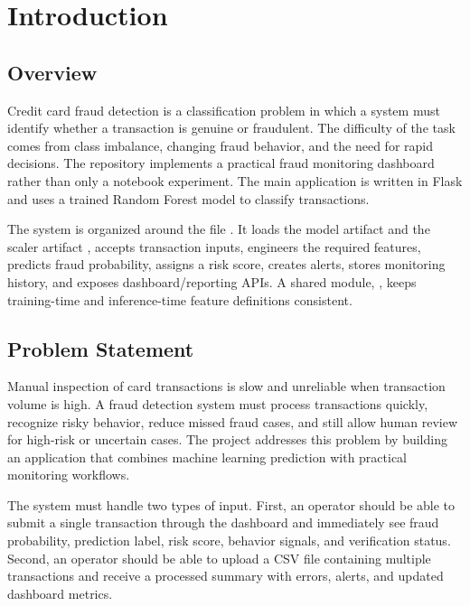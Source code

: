 \documentclass[12pt,a4paper]{report}
\begin{document}
\setcounter{page}{1}
\pagestyle{fancy}
\fancyhf{}
\fancyfoot[C]{\thepage}
\renewcommand{\headrulewidth}{0pt}
\fancypagestyle{plain}{
    \fancyhf{}
    \fancyfoot[C]{\thepage}
    \renewcommand{\headrulewidth}{0pt}
}

\chapter{Introduction}

\section{Overview}
Credit card fraud detection is a classification problem in which a system must identify whether a transaction is genuine or fraudulent. The difficulty of the task comes from class imbalance, changing fraud behavior, and the need for rapid decisions. The repository implements a practical fraud monitoring dashboard rather than only a notebook experiment. The main application is written in Flask and uses a trained Random Forest model to classify transactions.

The system is organized around the file . It loads the model artifact  and the scaler artifact , accepts transaction inputs, engineers the required features, predicts fraud probability, assigns a risk score, creates alerts, stores monitoring history, and exposes dashboard/reporting APIs. A shared module, , keeps training-time and inference-time feature definitions consistent.

\section{Problem Statement}
Manual inspection of card transactions is slow and unreliable when transaction volume is high. A fraud detection system must process transactions quickly, recognize risky behavior, reduce missed fraud cases, and still allow human review for high-risk or uncertain cases. The project addresses this problem by building an application that combines machine learning prediction with practical monitoring workflows.

The system must handle two types of input. First, an operator should be able to submit a single transaction through the dashboard and immediately see fraud probability, prediction label, risk score, behavior signals, and verification status. Second, an operator should be able to upload a CSV file containing multiple transactions and receive a processed summary with errors, alerts, and updated dashboard metrics.
\end{document}

